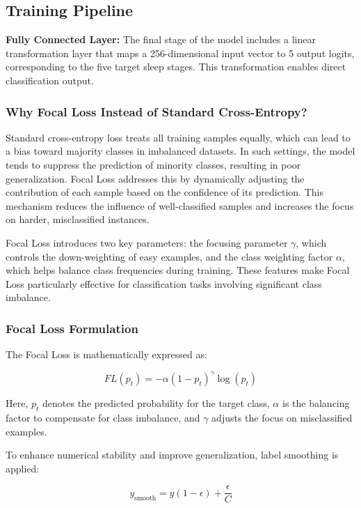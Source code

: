 \subsection{Training Pipeline}

\textbf{Fully Connected Layer:}  
The final stage of the model includes a linear transformation layer that maps a 256-dimensional input vector to 5 output logits, corresponding to the five target sleep stages. This transformation enables direct classification output.

\subsubsection*{Why Focal Loss Instead of Standard Cross-Entropy?}

Standard cross-entropy loss treats all training samples equally, which can lead to a bias toward majority classes in imbalanced datasets. In such settings, the model tends to suppress the prediction of minority classes, resulting in poor generalization. Focal Loss addresses this by dynamically adjusting the contribution of each sample based on the confidence of its prediction. This mechanism reduces the influence of well-classified samples and increases the focus on harder, misclassified instances.

Focal Loss introduces two key parameters: the focusing parameter $\gamma$, which controls the down-weighting of easy examples, and the class weighting factor $\alpha$, which helps balance class frequencies during training. These features make Focal Loss particularly effective for classification tasks involving significant class imbalance.

\subsubsection*{Focal Loss Formulation}

The Focal Loss is mathematically expressed as:

\[
FL(p_t) = -\alpha(1 - p_t)^{\gamma} \log(p_t)
\]

Here, $p_t$ denotes the predicted probability for the target class, $\alpha$ is the balancing factor to compensate for class imbalance, and $\gamma$ adjusts the focus on misclassified examples.

To enhance numerical stability and improve generalization, label smoothing is applied:

\[
y_{\text{smooth}} = y(1 - \epsilon) + \frac{\epsilon}{C}
\]

